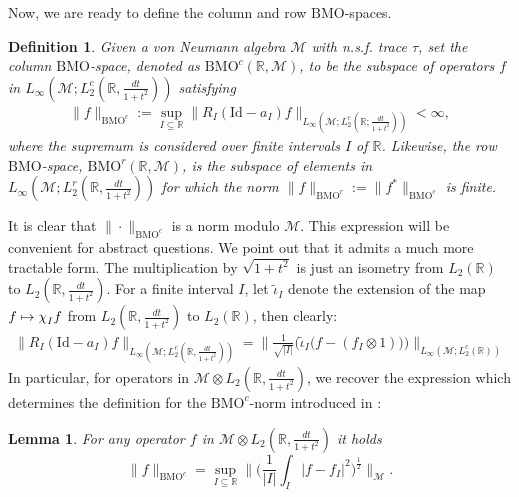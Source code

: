 \documentclass[psamsfonts]{amsart}
\newtheorem{lemma}[theorem]{Lemma}
\newtheorem{definition}[theorem]{Definition}
\newcommand{\R}{\mathbb{R}}
\newcommand*{\bigchi}{\mbox{\large$\chi$}}
\newcommand{\Linfty}{L_\infty}
\newcommand{\Ltwo}{L_2}
\newcommand{\Ltwor}{L_2^r}
\newcommand{\BMOc}{\mathrm{BMO}^c}
\newcommand{\BMOr}{\mathrm{BMO}^r}
\newcommand{\BMO}{\mathrm{BMO}}
\newcommand{\id}{\mathrm{Id}}
\begin{document}
    Now, we are ready to define the column and row $\BMO$-spaces.

    \begin{definition}
        Given a von Neumann algebra $\mathcal{M}$ with n.s.f. trace $\tau$, set the \emph{column $\BMO$-space}, denoted as $\BMOc(\mathbb{R},\mathcal{M})$, to be the subspace of operators $f$ in $\Linfty(\mathcal{M};L_2^c(\R,\frac{dt}{1+t^2}))$ satisfying
        \begin{align}\label{eq:BMOcnorm}
            \|f\|_{\BMOc} := \sup_{I \subseteq \mathbb{R}} \big\|R_I (\id- a_I) f \big\|_{\Linfty(\mathcal{M};L_2^c(\R;\frac{dt}{1+t^2}))} < \infty,
        \end{align}
        where the supremum is considered over finite intervals $I$ of $\mathbb{R}$. Likewise, the row $\BMO$-space, $\BMOr(\mathbb{R},\mathcal{M})$, is the subspace of elements in $\Linfty(\mathcal{M};\Ltwor(\mathbb{R},\frac{dt}{1+t^2}))$ for which the norm $\|f\|_{\BMOr} := \|f^*\|_{\BMOc}$ is finite.
    \end{definition}

    It is clear that $\|\cdot\|_{\BMOc}$ is a norm modulo
    $\mathcal{M}$. This expression will be convenient for abstract
    questions. We point out that it admits a much more tractable form.
    The multiplication by $\sqrt{1+t^2}$ is just an isometry from
    $\Ltwo(\R)$ to $\Ltwo(\R,\frac{dt}{1+t^2})$. For a finite interval $I$,
    let $\widetilde{\iota}_I$ denote the extension of the map
    $f\mapsto \bigchi_I f $ from $\Ltwo(\R, \frac{dt}{1+t^2})$ to $\Ltwo(\R)$, then clearly:
 \begin{align}\Big\|R_I (\id- a_I) f \Big\|_{\Linfty(\mathcal{M};L_2^c(\R,\frac{dt}{1+t^2}))} =\Big\|\frac 1 {\sqrt{|I|}}\big( \widetilde \iota_I\big (f -(f_I\otimes  1)\big)\big)\Big\|_{\Linfty(\mathcal{M};L_2^c(\R))}\label{eq:simple}\end{align}
In particular, for operators in $\mathcal{M} \otimes \Ltwo(\mathbb{R},\frac{dt}{1+t^2})$, we recover the expression which determines the definition for the $\BMOc$-norm introduced in \cite{M07}:
    \begin{lemma}
        For any operator $f$ in $\mathcal{M} \otimes \Ltwo(\mathbb{R},\frac{dt}{1+t^2})$ it holds
    $$
            \|f\|_{\BMOc} = \sup_{I \subseteq \mathbb{R}} \Bigg\| \Bigg( \frac{1}{|I|} \int_{I} |f - f_I|^2 \Bigg)^{\frac12} \Bigg\|_{\mathcal{M}}.
        $$\end{lemma}
    
\end{document}
